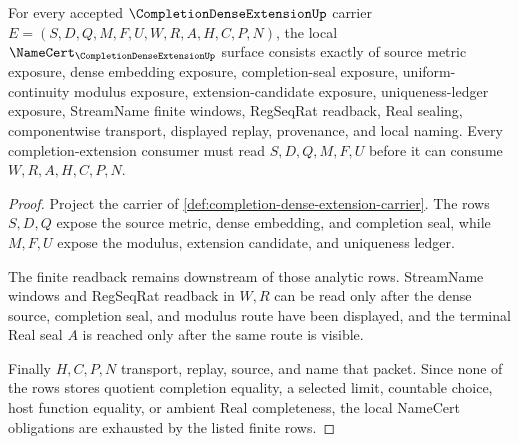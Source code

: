\begin{theorem}
\label{thm:completion-dense-extension-namecert-obligations}
For every accepted $\CompletionDenseExtensionUp$ carrier $E=(S,D,Q,M,F,U,W,R,A,H,C,P,N)$, the local $\NameCert_{\CompletionDenseExtensionUp}$ surface consists exactly of source metric exposure, dense embedding exposure, completion-seal exposure, uniform-continuity modulus exposure, extension-candidate exposure, uniqueness-ledger exposure, StreamName finite windows, RegSeqRat readback, Real sealing, componentwise transport, displayed replay, provenance, and local naming. Every completion-extension consumer must read $S,D,Q,M,F,U$ before it can consume $W,R,A,H,C,P,N$.
\end{theorem}
\begin{proof}
Project the carrier of \autoref{def:completion-dense-extension-carrier}. The rows $S,D,Q$ expose the source metric, dense embedding, and completion seal, while $M,F,U$ expose the modulus, extension candidate, and uniqueness ledger.

The finite readback remains downstream of those analytic rows. StreamName windows and RegSeqRat readback in $W,R$ can be read only after the dense source, completion seal, and modulus route have been displayed, and the terminal Real seal $A$ is reached only after the same route is visible.

Finally $H,C,P,N$ transport, replay, source, and name that packet. Since none of the rows stores quotient completion equality, a selected limit, countable choice, host function equality, or ambient Real completeness, the local NameCert obligations are exhausted by the listed finite rows.
\end{proof}



